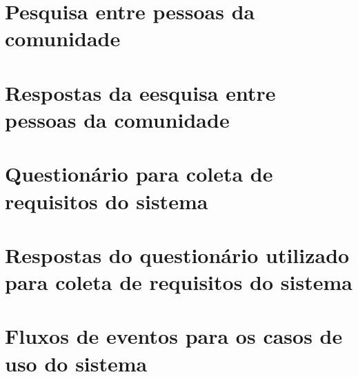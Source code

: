 \chapter{Pesquisa entre pessoas da comunidade}
\label{ch:pesquisa}
% 



\chapter{Respostas da eesquisa entre pessoas da comunidade}
\label{ch:pesquisa-respostas}
% 



\chapter{Questionário para coleta de requisitos do sistema}
\label{ch:coleta-requisitos}




\chapter{Respostas do questionário utilizado para coleta de requisitos do sistema}
\label{ch:coleta-requisitos-respostas}




\chapter{Fluxos de eventos para os casos de uso do sistema}
\label{ch:fluxos-eventos}


